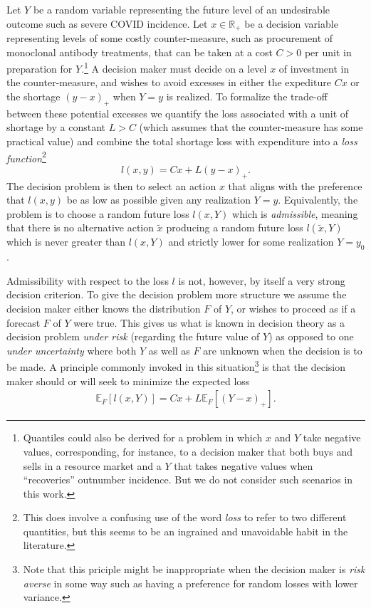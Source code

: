 \documentclass{article}\usepackage[]{graphicx}\usepackage[]{xcolor}
\begin{document}
Let $Y$ be a random variable
representing the future level of an undesirable outcome such as severe COVID incidence. Let $x \in \mathbb{R}_+$ be a decision variable
representing levels of some costly counter-measure, such as procurement of monoclonal antibody treatments,
that can be taken at a cost $C>0$ per unit in preparation for $Y$.\footnote{
Quantiles could also be derived for a problem in which $x$ and $Y$ take negative values, corresponding, for instance, to a decision
maker that both buys and sells in a resource market and a $Y$ that takes negative values when ``recoveries'' outnumber incidence.  
But we do not consider such scenarios in this work.	 
}  A decision maker must decide on a level $x$ of investment in the
counter-measure, and wishes to avoid excesses in either the expediture $Cx$ or the shortage $(y-x)_{+}$ when $Y=y$ is
realized. To formalize the trade-off between these potential excesses we quantify the loss associated with a unit of
shortage by a constant $L>C$ (which assumes that the counter-measure has some practical value) and combine the total shortage loss with expenditure into a \emph{loss function}\footnote
{This does involve a confusing use of the word \emph{loss} to refer to two different quantities, but this seems to be
an ingrained and unavoidable habit in the literature.}
\[
l(x,y) = Cx + L(y-x)_{+}.
\] 
The decision problem is then to select an action $x$ that aligns with the preference that $l(x,y)$ be
as low as possible given any realization $Y=y$.  Equivalently, the problem is to choose a random future loss $l(x,Y)$ which
is \emph{admissible}, meaning that there is no alternative action $\tilde{x}$ producing a random future loss $l(\tilde{x},Y)$
which is never greater than $l(x,Y)$ and strictly lower for some realization $Y=y_0$.

Admissibility with respect to the loss $l$ is not, however, by itself a very strong decision criterion.
To give the decision problem more structure we assume the decision maker either knows the distribution $F$ of $Y$, or
wishes to proceed as if a forecast $F$ of $Y$ were true. This gives us what is known in decision theory as a decision
problem \emph{under risk} (regarding the future value of $Y$) as opposed to one \emph{under uncertainty} where both $Y$
as well as $F$ are unknown when the decision is to be made. A principle commonly invoked in this situation\footnote
{Note that this priciple might be inappropriate when the decision maker is \emph{risk averse} in some way such as
having a preference for random losses with lower variance.} is that the decision maker should or will seek to minimize the expected
loss
\begin{align}
  \mathbb{E}_{F}[l(x,Y)] = Cx + L\mathbb{E}_{F}[(Y-x)_{+}]. \label{eqn:expQloss}
\end{align}
\end{document}
